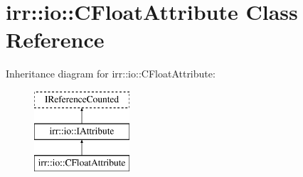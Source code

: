 \hypertarget{classirr_1_1io_1_1_c_float_attribute}{\section{irr\-:\-:io\-:\-:C\-Float\-Attribute Class Reference}
\label{classirr_1_1io_1_1_c_float_attribute}
}
Inheritance diagram for irr\-:\-:io\-:\-:C\-Float\-Attribute\-:\begin{figure}[H]
\begin{center}
\leavevmode
\includegraphics[height=3.000000cm]{classirr_1_1io_1_1_c_float_attribute}
\end{center}
\end{figure}
